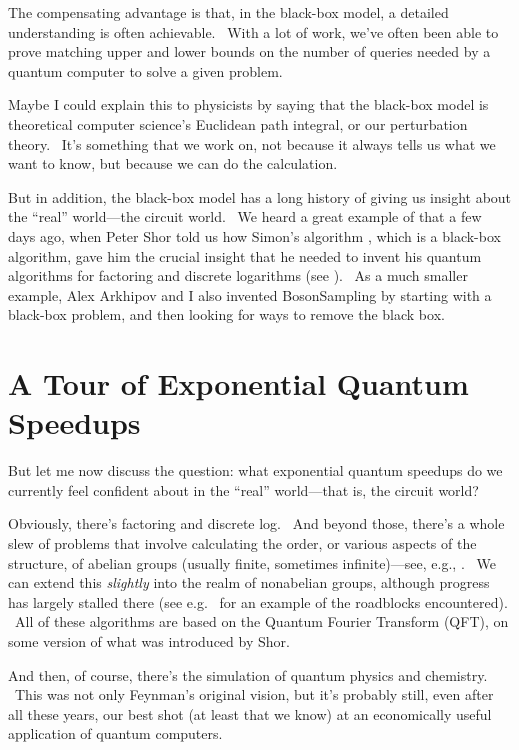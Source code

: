 \documentclass[11pt]{article}
\begin{document}
The compensating advantage is that, in the black-box model, a detailed understanding is often achievable. \ With a lot of work, we've often been able to prove matching upper and lower bounds on the number of queries needed by a quantum computer to solve a given problem.

Maybe I could explain this to physicists by saying that the black-box model is theoretical computer science's Euclidean path integral, or our perturbation theory. \ It's something that we work on, not because it always tells us what we want to know, but because we can do the calculation.

But in addition, the black-box model has a long history of giving us insight about the ``real'' world---the circuit world. \ We heard a great example of that a few days ago, when Peter Shor told us how Simon's algorithm \cite{simon}, which is a black-box algorithm, gave him the crucial insight that he needed to invent his quantum algorithms for factoring and discrete logarithms (see \cite{shor:solvay}). \ As a much smaller example, Alex Arkhipov and I also invented BosonSampling \cite{aark} by starting with a black-box problem, and then looking for ways to remove the black box.


\section{A Tour of Exponential Quantum Speedups}

But let me now discuss the question: what exponential quantum speedups do we currently feel confident about in the ``real'' world---that is, the circuit world?

Obviously, there's factoring and discrete log. \ And beyond those, there's a whole slew of problems that involve calculating the order, or various aspects of the structure, of abelian groups (usually finite, sometimes infinite)---see, e.g., \cite{hallgren}. \ We can extend this \emph{slightly} into the realm of nonabelian groups, although progress has largely stalled there (see e.g.\ \cite{hmrrs} for an example of the roadblocks encountered). \ All of these algorithms are based on the Quantum Fourier Transform (QFT), on some version of what was introduced by Shor.

And then, of course, there's the simulation of quantum physics and chemistry. \ This was not only Feynman's original vision, but it's probably still, even after all these years, our best shot (at least that we know) at an economically useful application of quantum computers.
\end{document}
